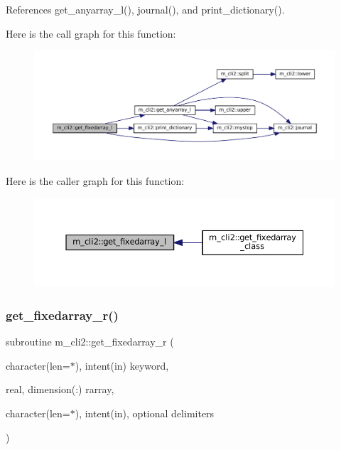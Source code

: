 References get\+\_\+anyarray\+\_\+l(), journal(), and print\+\_\+dictionary().

Here is the call graph for this function\+:
\nopagebreak
\begin{figure}[H]
\begin{center}
\leavevmode
\includegraphics[width=350pt]{namespacem__cli2_a65ffe8c7a444db5db3be3f6edecef008_cgraph}
\end{center}
\end{figure}
Here is the caller graph for this function\+:
\nopagebreak
\begin{figure}[H]
\begin{center}
\leavevmode
\includegraphics[width=350pt]{namespacem__cli2_a65ffe8c7a444db5db3be3f6edecef008_icgraph}
\end{center}
\end{figure}
\mbox{\label{namespacem__cli2_afbec790abad0dca990c0a61cd2d9e9ae}} 
\subsubsection{\texorpdfstring{get\+\_\+fixedarray\+\_\+r()}{get\_fixedarray\_r()}}
{\footnotesize\ttfamily subroutine m\+\_\+cli2\+::get\+\_\+fixedarray\+\_\+r (\begin{DoxyParamCaption}\item[{character(len=$\ast$), intent(in)}]{keyword,  }\item[{real, dimension(\+:)}]{rarray,  }\item[{character(len=$\ast$), intent(in), optional}]{delimiters }\end{DoxyParamCaption})\hspace{0.3cm}{\ttfamily [private]}}



